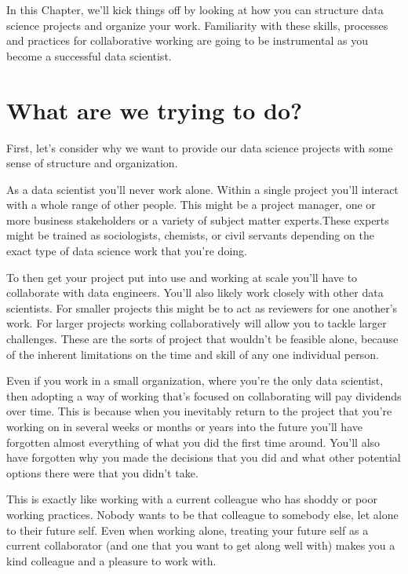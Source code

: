 \documentclass[
  12pt,
]{book}
\begin{document}
In this Chapter, we'll kick things off by looking at how you can structure data
science projects and organize your work. Familiarity with these skills, processes
and practices for collaborative working are going to be instrumental as you
become a successful data scientist.

\hypertarget{what-are-we-trying-to-do}{%
\section{What are we trying to do?}\label{what-are-we-trying-to-do}}

First, let's consider why we want to provide our data science projects with some sense of structure and organization.

As a data scientist you'll never work alone. Within a single project you'll interact with a whole range of other people. This might be a project manager, one or more business stakeholders or a variety of subject matter experts.These experts might be trained as sociologists, chemists, or civil servants depending on the exact type of data science work that you're doing.

To then get your project put into use and working at scale you'll have to
collaborate with data engineers. You'll also likely work closely with other data scientists. For smaller projects this might be to act as reviewers for one another's work. For larger projects working collaboratively will allow you to tackle larger challenges. These are the sorts of project that wouldn't be feasible alone, because of the inherent limitations on the time and skill of any one individual person.

Even if you work in a small organization, where you're the only data scientist, then adopting a way of working that's focused on collaborating will pay dividends over time. This is because when you inevitably return to the project that you're working on in several weeks or months or years into the future you'll have forgotten almost everything of what you did the first time around. You'll also have forgotten why you made the decisions that you did and what other potential options there were that you didn't take.

This is exactly like working with a current colleague who has shoddy or poor working practices. Nobody wants to be that colleague to somebody else, let alone to their future self. Even when working alone, treating your future self as a current collaborator (and one that you want to get along well with) makes you a kind colleague and a pleasure to work with.
\end{document}
